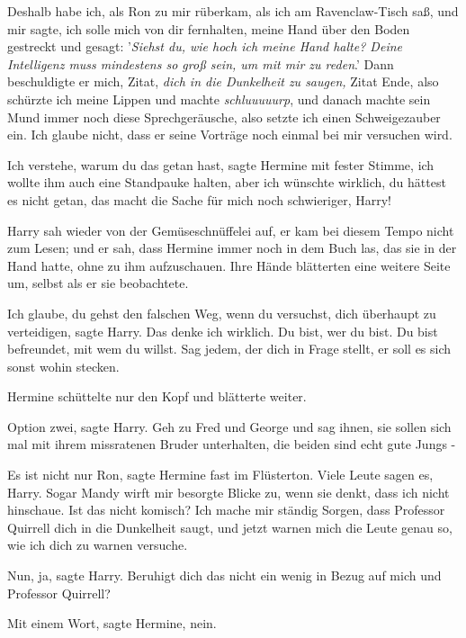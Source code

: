 \glqq Deshalb habe ich, als Ron zu mir rüberkam, als ich am Ravenclaw-Tisch saß,
und mir sagte, ich solle mich von dir fernhalten, meine Hand über den Boden
gestreckt und gesagt: '\emph{Siehst du, wie hoch ich meine Hand halte? Deine
Intelligenz muss mindestens so groß sein, um mit mir zu reden}.' Dann
beschuldigte er mich, Zitat, \emph{dich in die Dunkelheit zu saugen, }Zitat
Ende, also schürzte ich meine Lippen und machte \emph{schluuuuurp}, und danach
machte sein Mund immer noch diese Sprechgeräusche, also setzte ich einen
Schweigezauber ein. Ich glaube nicht, dass er seine Vorträge noch einmal bei mir
versuchen wird.\grqq{}

\glqq Ich verstehe, warum du das getan hast\grqq{}, sagte Hermine mit fester
Stimme, \glqq ich wollte ihm auch eine Standpauke halten, aber ich wünschte
wirklich, du hättest es nicht getan, das macht die Sache für mich noch
schwieriger, Harry!\grqq{}

Harry sah wieder von der Gemüseschnüffelei auf, er kam bei diesem Tempo nicht
zum Lesen; und er sah, dass Hermine immer noch in dem Buch las, das sie in der
Hand hatte, ohne zu ihm aufzuschauen. Ihre Hände blätterten eine weitere Seite
um, selbst als er sie beobachtete.

\glqq Ich glaube, du gehst den falschen Weg, wenn du versuchst, dich überhaupt
zu verteidigen\grqq{}, sagte Harry. \glqq Das denke ich wirklich. Du bist, wer
du bist. Du bist befreundet, mit wem du willst. Sag jedem, der dich in Frage
stellt, er soll es sich sonst wohin stecken.\grqq{}

Hermine schüttelte nur den Kopf und blätterte weiter.

\glqq Option zwei\grqq{}, sagte Harry. \glqq Geh zu Fred und George und sag
ihnen, sie sollen sich mal mit ihrem missratenen Bruder unterhalten, die beiden
sind echt gute Jungs -\grqq{}

\glqq Es ist nicht nur Ron\grqq{}, sagte Hermine fast im Flüsterton. \glqq Viele
Leute sagen es, Harry. Sogar Mandy wirft mir besorgte Blicke zu, wenn sie denkt,
dass ich nicht hinschaue. Ist das nicht komisch? Ich mache mir ständig Sorgen,
dass Professor Quirrell dich in die Dunkelheit saugt, und jetzt warnen mich die
Leute genau so, wie ich dich zu warnen versuche.\grqq{}

\glqq Nun, ja\grqq{}, sagte Harry. \glqq Beruhigt dich das nicht ein wenig in
Bezug auf mich und Professor Quirrell?\grqq{}

\glqq Mit einem Wort\grqq{}, sagte Hermine, \glqq nein.\grqq{}

